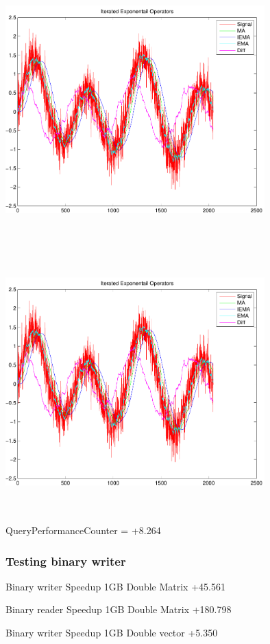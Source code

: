 \documentclass[9pt]{article}
\theoremstyle{plain}
\theoremstyle{definition}
\theoremstyle{remark}
\numberwithin{equation}{section}
\begin{document}
\includegraphics[width=10.0cm,height=10.0cm]{IteratedExponentailOperators.pdf}

\includegraphics[width=10.0cm,height=10.0cm]{IteratedExponentailOperators.pdf}

QueryPerformanceCounter  =  +8.264
\subsubsection{Testing binary writer}
Binary writer Speedup 1GB Double Matrix +45.561

Binary reader Speedup 1GB Double Matrix +180.798

Binary writer Speedup 1GB Double vector +5.350
\end{document}
